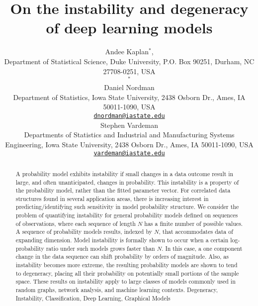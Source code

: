 \documentclass[numbib]{imamat}
\theoremstyle{theorem}
\theoremstyle{lemma}
\theoremstyle{example}
\theoremstyle{corollary}
\theoremstyle{definition}
\theoremstyle{remark}
\theoremstyle{approximation}
\theoremstyle{scheme}
\begin{document}
\title{On the instability and degeneracy of deep learning models}

\author{{\sc Andee Kaplan}\(^*\), \\[2pt] Department of Statistical Science, Duke University, P.O. Box 90251,
Durham, NC 27708-0251, USA \\ \(^*\){}
\\[6pt] {\sc Daniel Nordman} \\[2pt] Department of Statistics, Iowa State University, 2438 Osborn Dr., Ames,
IA 50011-1090, USA \\ {\href{mailto:dnordman@iastate.edu}{\nolinkurl{dnordman@iastate.edu}}}  
\\[6pt] {\sc Stephen Vardeman} \\[2pt] Departments of Statistics and Industrial and Manufacturing Systems
Engineering, Iowa State University, 2438 Osborn Dr., Ames, IA
50011-1090, USA \\ {\href{mailto:vardeman@iastate.edu}{\nolinkurl{vardeman@iastate.edu}}}  
}

\maketitle


\begin{abstract}
{A probability model exhibits instability if small changes in a data
outcome result in large, and often unanticipated, changes in
probability. This instability is a property of the probability model,
rather than the fitted parameter vector. For correlated data structures
found in several application areas, there is increasing interest in
predicting/identifying such sensitivity in model probability structure.
We consider the problem of quantifying instability for general
probability models defined on sequences of observations, where each
sequence of length \(N\) has a finite number of possible values. A
sequence of probability models results, indexed by \(N\), that
accommodates data of expanding dimension. Model instability is formally
shown to occur when a certain log-probability ratio under such models
grows faster than \(N\). In this case, a one component change in the
data sequence can shift probability by orders of magnitude. Also, as
instability becomes more extreme, the resulting probability models are
shown to tend to degeneracy, placing all their probability on
potentially small portions of the sample space. These results on
instability apply to large classes of models commonly used in random
graphs, network analysis, and machine learning contexts.}
{Degeneracy, Instability, Classification, Deep Learning, Graphical Models}
\end{abstract}
\end{document}
